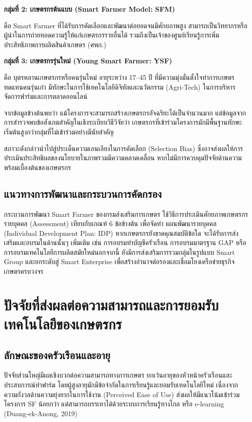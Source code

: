\textbf{กลุ่มที่ 2: เกษตรกรต้นแบบ (Smart Farmer Model: SFM)}

คือ Smart Farmer ที่ได้รับการคัดเลือกและพัฒนาต่อยอดจนมีศักยภาพสูง สามารถเป็นวิทยากรหรือผู้นำในการถ่ายทอดความรู้ให้แก่เกษตรกรรายอื่นได้ รวมถึงเป็นเจ้าของศูนย์เรียนรู้การเพิ่มประสิทธิภาพการผลิตสินค้าเกษตร (ศพก.)

\textbf{กลุ่มที่ 3: เกษตรกรรุ่นใหม่ (Young Smart Farmer: YSF)}

คือ บุตรหลานเกษตรกรหรือคนรุ่นใหม่ อายุระหว่าง 17--45 ปี ที่มีความมุ่งมั่นตั้งใจทำการเกษตรทดแทนคนรุ่นเก่า มีทักษะในการใช้เทคโนโลยีดิจิทัลและนวัตกรรม (Agri-Tech) ในการบริหารจัดการฟาร์มและการตลาดออนไลน์

จากข้อมูลข้างต้นพบว่า แม้โครงการจะสามารถสร้างเกษตรกรอัจฉริยะได้เป็นจำนวนมาก แต่ข้อมูลจากการสำรวจพบข้อสังเกตสำคัญในเชิงระเบียบวิธีวิจัยว่า เกษตรกรที่เข้าร่วมโครงการมักมีพื้นฐานทักษะเริ่มต้นสูงกว่ากลุ่มที่ไม่เข้าร่วมอย่างมีนัยสำคัญ

สภาวะดังกล่าวนำไปสู่ประเด็นความเอนเอียงในการคัดเลือก (Selection Bias) ซึ่งอาจส่งผลให้การประเมินประสิทธิผลของนโยบายในภาพรวมมีความคลาดเคลื่อน หากไม่มีการควบคุมปัจจัยด้านความพร้อมเบื้องต้นของเกษตรกร \cite{hwang2024}

\subsection{แนวทางการพัฒนาและกระบวนการคัดกรอง}
กระบวนการพัฒนา Smart Farmer ของกรมส่งเสริมการเกษตร ใช้วิธีการประเมินศักยภาพเกษตรกรรายบุคคล (Assessment) เทียบกับเกณฑ์ 6 ข้อข้างต้น เพื่อจัดทำ แผนพัฒนารายบุคคล (Individual Development Plan: IDP) หากเกษตรกรยังขาดคุณสมบัติข้อใด จะได้รับการส่งเสริมและอบรมในด้านนั้นๆ เพิ่มเติม เช่น การอบรมทำบัญชีครัวเรือน การอบรมมาตรฐาน GAP หรือการอบรมเทคโนโลยีการผลิตสมัยใหม่นอกจากนี้ ยังมีการส่งเสริมการรวมกลุ่มในรูปแบบ Smart Group และยกระดับสู่ Smart Enterprise เพื่อสร้างอำนาจต่อรองและเชื่อมโยงเครือข่ายธุรกิจเกษตรครบวงจร

\section{ปัจจัยที่ส่งผลต่อความสามารถและการยอมรับเทคโนโลยีของเกษตรกร}
\subsection{ลักษณะของครัวเรือนและอายุ}
ปัจจัยส่วนใหญ่มีผลเชิงบวกต่อความสามารถทางการเกษตร ยกเว้นอายุของหัวหน้าครัวเรือนและประสบการณ์ทำฟาร์ม \cite{abdallah2016,anang2020}
โดยผู้สูงอายุมักมีข้อจำกัดในการเรียนรู้และยอมรับเทคโนโลยีใหม่ เนื่องจากความกังวลด้านความยุ่งยากในการใช้งาน (Perceived Ease of Use) ส่งผลให้มีแนวโน้มเข้าร่วมโครงการ SF น้อยกว่า แต่สามารถบรรเทาได้ด้วยระบบการเรียนรู้ทางไกล หรือ e-learning (Duang-ek-Anong, 2019)
